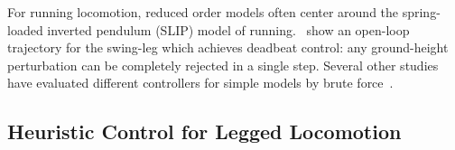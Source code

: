 For running locomotion, reduced order models often center around the spring-loaded inverted pendulum (SLIP) model of running.~\textcite{wu20133} show an open-loop trajectory for the swing-leg which achieves deadbeat control: any ground-height perturbation can be completely rejected in a single step.
Several other studies have evaluated different controllers for simple models by brute force~\cite{piovan2013two,cnops2015basin,piovan2015reachability}.



\subsection{Heuristic Control for Legged Locomotion}



